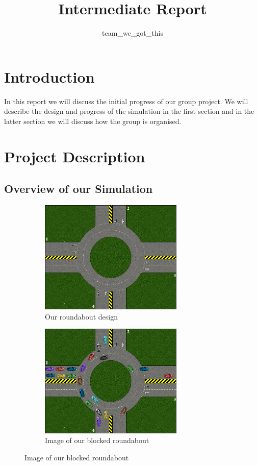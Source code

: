 \documentclass[11pt]{article}
\title{{Intermediate Report}}
\date{}
\author{team\_we\_got\_this}
\begin{document}
	\maketitle
	\thispagestyle{fancy}
	\section{Introduction}
	In this report we will discuss the initial progress of our group project. 
	We will describe the design and progress of the simulation in the first section and in the latter section we will discuss how the group is organised.
	
	\section{Project Description}
	
	\subsection{Overview of our Simulation}
	\begin{figure}
		\begin{subfigure}{.45\textwidth}
		\centering
		\includegraphics[width=0.75\textwidth]{Roundabout2}
		\caption{Our roundabout design}
		\label{RoundaboutDesign}
		\end{subfigure}
		\begin{subfigure}{.45\textwidth}
		\centering
		\includegraphics[width=0.75\textwidth]{SteadyFlow}
		\caption{Image of our blocked roundabout}
		\label{Steadyflow}
		\end{subfigure}
	\end{figure}
\end{document}
